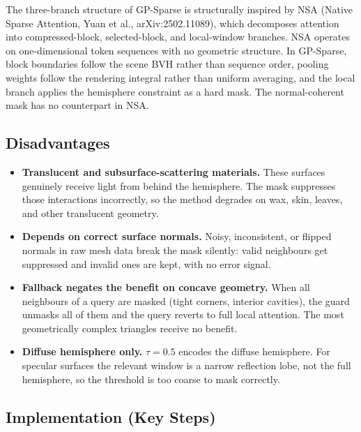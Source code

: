 \documentclass[11pt,letterpaper]{article}
\begin{document}
The three-branch structure of GP-Sparse is structurally inspired by NSA
(Native Sparse Attention, Yuan et al., arXiv:2502.11089), which decomposes
attention into compressed-block, selected-block, and local-window branches.
NSA operates on one-dimensional token sequences with no geometric structure.
In GP-Sparse, block boundaries follow the scene BVH rather than sequence
order, pooling weights follow the rendering integral rather than uniform
averaging, and the local branch applies the hemisphere constraint as a hard
mask.
The normal-coherent mask has no counterpart in NSA.

\subsection{Disadvantages}

\begin{itemize}[nosep]
  \item \textbf{Translucent and subsurface-scattering materials.}
    These surfaces genuinely receive light from behind the hemisphere.
    The mask suppresses those interactions incorrectly, so the method
    degrades on wax, skin, leaves, and other translucent geometry.
  \item \textbf{Depends on correct surface normals.}
    Noisy, inconsistent, or flipped normals in raw mesh data break the
    mask silently: valid neighbours get suppressed and invalid ones are
    kept, with no error signal.
  \item \textbf{Fallback negates the benefit on concave geometry.}
    When all neighbours of a query are masked (tight corners, interior
    cavities), the guard unmasks all of them and the query reverts to
    full local attention. The most geometrically complex triangles
    receive no benefit.
  \item \textbf{Diffuse hemisphere only.}
    $\tau = 0.5$ encodes the diffuse hemisphere. For specular surfaces
    the relevant window is a narrow reflection lobe, not the full
    hemisphere, so the threshold is too coarse to mask correctly.
\end{itemize}

\subsection{Implementation (Key Steps)}
\end{document}
